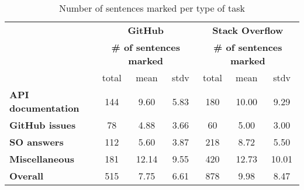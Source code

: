 \begin{table}[H]
\centering    
\caption{Number of sentences marked per type of task}
\label{tbl:corpus-annotation-summary-by-task}
\begin{footnotesize}
\begin{threeparttable}
\begin{tabular}{lcccccc}



& \multicolumn{3}{c}{\textbf{GitHub}} & \multicolumn{3}{c}{\textbf{Stack Overflow}} \\

& \multicolumn{3}{c}{\textbf{\# of sentences marked}} 
& \multicolumn{3}{c}{\textbf{\# of sentences marked}}
\\ \cmidrule(l){2-4}  \cmidrule(l){5-7} 

& total & mean & stdv 
%
& total & mean & stdv
\\

\hline

\textbf{API documentation} 
& 144 & 9.60 & 5.83 %
& 180 & 10.00 & 9.29 %
\\
\textbf{GitHub issues} 
& 78 & 4.88 & 3.66 %
& 60 & 5.00 & 3.00 %
\\
\textbf{SO answers} 
& 112 & 5.60 & 3.87 %
& 218 & 8.72 & 5.50 %
\\
\textbf{Miscellaneous} 
& 181 & 12.14 & 9.55 %
& 420 & 12.73 & 10.01 %
\\

\hline
\textbf{Overall} 
& 515 & 7.75 & 6.61 %
& 878 & 9.98 & 8.47 %
\\
\hline

\end{tabular}
\end{threeparttable}
\end{footnotesize}
\end{table}

